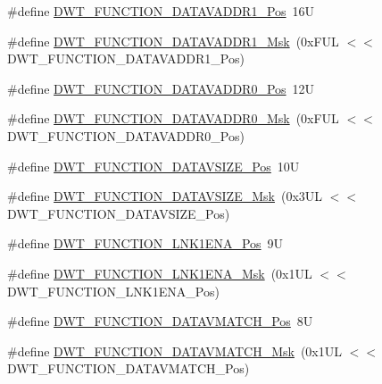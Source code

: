 \begin{DoxyCompactItemize}
\item 
\#define \mbox{\hyperlink{group___c_m_s_i_s___d_w_t_ga8b75e8ab3ffd5ea2fa762d028dc30e8c}{D\+W\+T\+\_\+\+F\+U\+N\+C\+T\+I\+O\+N\+\_\+\+D\+A\+T\+A\+V\+A\+D\+D\+R1\+\_\+\+Pos}}~16U
\item 
\#define \mbox{\hyperlink{group___c_m_s_i_s___d_w_t_gafdbf5a8c367befe8661a4f6945c83445}{D\+W\+T\+\_\+\+F\+U\+N\+C\+T\+I\+O\+N\+\_\+\+D\+A\+T\+A\+V\+A\+D\+D\+R1\+\_\+\+Msk}}~(0x\+F\+U\+L $<$$<$ D\+W\+T\+\_\+\+F\+U\+N\+C\+T\+I\+O\+N\+\_\+\+D\+A\+T\+A\+V\+A\+D\+D\+R1\+\_\+\+Pos)
\item 
\#define \mbox{\hyperlink{group___c_m_s_i_s___d_w_t_ga9854cd8bf16f7dce0fb196a8029b018e}{D\+W\+T\+\_\+\+F\+U\+N\+C\+T\+I\+O\+N\+\_\+\+D\+A\+T\+A\+V\+A\+D\+D\+R0\+\_\+\+Pos}}~12U
\item 
\#define \mbox{\hyperlink{group___c_m_s_i_s___d_w_t_gafc5efbe8f9b51e04aecd00c8a4eb50fb}{D\+W\+T\+\_\+\+F\+U\+N\+C\+T\+I\+O\+N\+\_\+\+D\+A\+T\+A\+V\+A\+D\+D\+R0\+\_\+\+Msk}}~(0x\+F\+U\+L $<$$<$ D\+W\+T\+\_\+\+F\+U\+N\+C\+T\+I\+O\+N\+\_\+\+D\+A\+T\+A\+V\+A\+D\+D\+R0\+\_\+\+Pos)
\item 
\#define \mbox{\hyperlink{group___c_m_s_i_s___d_w_t_ga0517a186d4d448aa6416440f40fe7a4d}{D\+W\+T\+\_\+\+F\+U\+N\+C\+T\+I\+O\+N\+\_\+\+D\+A\+T\+A\+V\+S\+I\+Z\+E\+\_\+\+Pos}}~10U
\item 
\#define \mbox{\hyperlink{group___c_m_s_i_s___d_w_t_gaab42cbc1e6084c44d5de70971613ea76}{D\+W\+T\+\_\+\+F\+U\+N\+C\+T\+I\+O\+N\+\_\+\+D\+A\+T\+A\+V\+S\+I\+Z\+E\+\_\+\+Msk}}~(0x3\+U\+L $<$$<$ D\+W\+T\+\_\+\+F\+U\+N\+C\+T\+I\+O\+N\+\_\+\+D\+A\+T\+A\+V\+S\+I\+Z\+E\+\_\+\+Pos)
\item 
\#define \mbox{\hyperlink{group___c_m_s_i_s___d_w_t_ga89d7c48858b4d4de96cdadfac91856a1}{D\+W\+T\+\_\+\+F\+U\+N\+C\+T\+I\+O\+N\+\_\+\+L\+N\+K1\+E\+N\+A\+\_\+\+Pos}}~9U
\item 
\#define \mbox{\hyperlink{group___c_m_s_i_s___d_w_t_ga64bd419260c3337cacf93607d1ad27ac}{D\+W\+T\+\_\+\+F\+U\+N\+C\+T\+I\+O\+N\+\_\+\+L\+N\+K1\+E\+N\+A\+\_\+\+Msk}}~(0x1\+U\+L $<$$<$ D\+W\+T\+\_\+\+F\+U\+N\+C\+T\+I\+O\+N\+\_\+\+L\+N\+K1\+E\+N\+A\+\_\+\+Pos)
\item 
\#define \mbox{\hyperlink{group___c_m_s_i_s___d_w_t_ga106f3672cd4be7c7c846e20497ebe5a6}{D\+W\+T\+\_\+\+F\+U\+N\+C\+T\+I\+O\+N\+\_\+\+D\+A\+T\+A\+V\+M\+A\+T\+C\+H\+\_\+\+Pos}}~8U
\item 
\#define \mbox{\hyperlink{group___c_m_s_i_s___d_w_t_ga32af1f1c0fcd2d8d9afd1ad79cd9970e}{D\+W\+T\+\_\+\+F\+U\+N\+C\+T\+I\+O\+N\+\_\+\+D\+A\+T\+A\+V\+M\+A\+T\+C\+H\+\_\+\+Msk}}~(0x1\+U\+L $<$$<$ D\+W\+T\+\_\+\+F\+U\+N\+C\+T\+I\+O\+N\+\_\+\+D\+A\+T\+A\+V\+M\+A\+T\+C\+H\+\_\+\+Pos)
$$
\end{DoxyCompactItemize}
